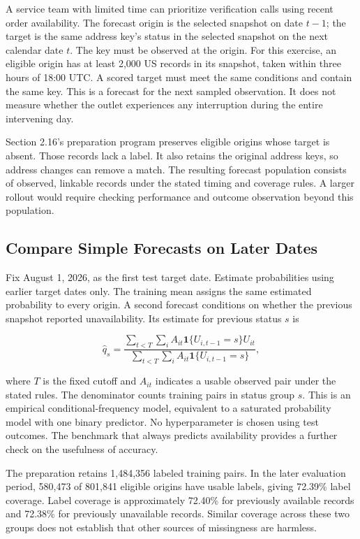 \noindent \noindent A service team with limited time can prioritize verification
calls using recent order availability. The forecast origin is the
selected snapshot on date \(t-1\); the target is the same address key's
status in the selected snapshot on the next calendar date \(t\). The key
must be observed at the origin. For this exercise, an eligible origin
has at least 2,000 US records in its snapshot, taken within three hours
of 18:00 UTC. A scored target must meet the same conditions and contain
the same key. This is a forecast for the next sampled observation. It
does not measure whether the outlet experiences any interruption during
the entire intervening day.

Section 2.16's preparation program preserves eligible origins whose
target is absent. Those records lack a label. It also retains the
original address keys, so address changes can remove a match. The
resulting forecast population consists of observed, linkable records
under the stated timing and coverage rules. A larger rollout would
require checking performance and outcome observation beyond this
population.

\hypertarget{M07-compare-simple-forecasts-on-later-dates}{%
\subsection{Compare Simple Forecasts on Later
Dates}\label{M07-compare-simple-forecasts-on-later-dates}}

\noindent \noindent Fix August 1, 2026, as the first test target date. Estimate
probabilities using earlier target dates only. The training mean assigns
the same estimated probability to every origin. A second forecast
conditions on whether the previous snapshot reported unavailability. Its
estimate for previous status \(s\) is

\[
\widehat q_s=
\frac{\sum_{t<T}\sum_i A_{it}\mathbf{1}\{U_{i,t-1}=s\}U_{it}}
{\sum_{t<T}\sum_i A_{it}\mathbf{1}\{U_{i,t-1}=s\}},
\]

where \(T\) is the fixed cutoff and \(A_{it}\) indicates a usable
observed pair under the stated rules. The denominator counts training
pairs in status group \(s\). This is an empirical conditional-frequency
model, equivalent to a saturated probability model with one binary
predictor. No hyperparameter is chosen using test outcomes. The
benchmark that always predicts availability provides a further check on
the usefulness of accuracy.

The preparation retains 1,484,356 labeled training pairs. In the later
evaluation period, 580,473 of 801,841 eligible origins have usable
labels, giving 72.39\% label coverage. Label coverage is approximately
72.40\% for previously available records and 72.38\% for previously
unavailable records. Similar coverage across these two groups does not
establish that other sources of missingness are harmless.


